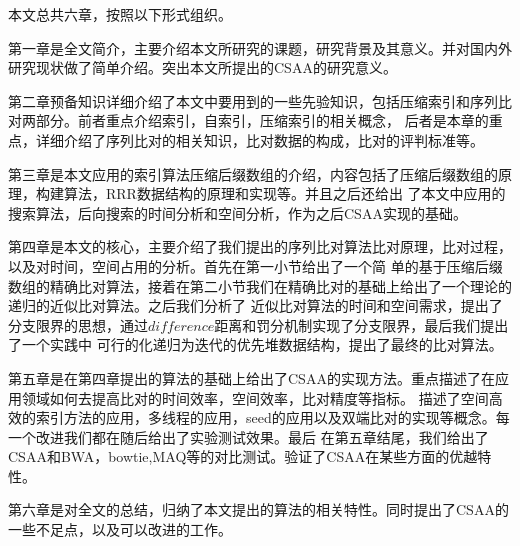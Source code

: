 本文总共六章，按照以下形式组织。

第一章是全文简介，主要介绍本文所研究的课题，研究背景及其意义。并对国内外研究现状做了简单介绍。突出本文所提出的CSAA的研究意义。

第二章预备知识详细介绍了本文中要用到的一些先验知识，包括压缩索引和序列比对两部分。前者重点介绍索引，自索引，压缩索引的相关概念，
后者是本章的重点，详细介绍了序列比对的相关知识，比对数据的构成，比对的评判标准等。

第三章是本文应用的索引算法压缩后缀数组的介绍，内容包括了压缩后缀数组的原理，构建算法，RRR数据结构的原理和实现等。并且之后还给出
了本文中应用的搜索算法，后向搜索的时间分析和空间分析，作为之后CSAA实现的基础。

第四章是本文的核心，主要介绍了我们提出的序列比对算法比对原理，比对过程，以及对时间，空间占用的分析。首先在第一小节给出了一个简
单的基于压缩后缀数组的精确比对算法，接着在第二小节我们在精确比对的基础上给出了一个理论的递归的近似比对算法。之后我们分析了
近似比对算法的时间和空间需求，提出了分支限界的思想，通过$difference$距离和罚分机制实现了分支限界，最后我们提出了一个实践中
可行的化递归为迭代的优先堆数据结构，提出了最终的比对算法。

第五章是在第四章提出的算法的基础上给出了CSAA的实现方法。重点描述了在应用领域如何去提高比对的时间效率，空间效率，比对精度等指标。
描述了空间高效的索引方法的应用，多线程的应用，seed的应用以及双端比对的实现等概念。每一个改进我们都在随后给出了实验测试效果。最后
在第五章结尾，我们给出了CSAA和BWA，bowtie,MAQ等的对比测试。验证了CSAA在某些方面的优越特性。

第六章是对全文的总结，归纳了本文提出的算法的相关特性。同时提出了CSAA的一些不足点，以及可以改进的工作。
